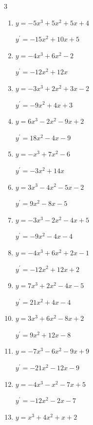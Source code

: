 \begin{multicols}{3}
\begin{enumerate}
        $\displaystyle y^{\prime}=27x^{2}+10x+9$

  \item $y=-5x^{3}+5x^{2}+5x+4$

        $\displaystyle y^{\prime}=-15x^{2}+10x+5$

  \item $y=-4x^{3}+6x^{2}-2$

        $\displaystyle y^{\prime}=-12x^{2}+12x$

  \item $y=-3x^{3}+2x^{2}+3x-2$

        $\displaystyle y^{\prime}=-9x^{2}+4x+3$

\columnbreak %

  \item $y=6x^{3}-2x^{2}-9x+2$

        $\displaystyle y^{\prime}=18x^{2}-4x-9$

  \item $y=-x^{3}+7x^{2}-6$

        $\displaystyle y^{\prime}=-3x^{2}+14x$

  \item $y=3x^{3}-4x^{2}-5x-2$

        $\displaystyle y^{\prime}=9x^{2}-8x-5$

  \item $y=-3x^{3}-2x^{2}-4x+5$

        $\displaystyle y^{\prime}=-9x^{2}-4x-4$

  \item $y=-4x^{3}+6x^{2}+2x-1$

        $\displaystyle y^{\prime}=-12x^{2}+12x+2$

  \item $y=7x^{3}+2x^{2}-4x-5$

        $\displaystyle y^{\prime}=21x^{2}+4x-4$

  \item $y=3x^{3}+6x^{2}-8x+2$

        $\displaystyle y^{\prime}=9x^{2}+12x-8$

  \item $y=-7x^{3}-6x^{2}-9x+9$

        $\displaystyle y^{\prime}=-21x^{2}-12x-9$

  \item $y=-4x^{3}-x^{2}-7x+5$

        $\displaystyle y^{\prime}=-12x^{2}-2x-7$

  \item $y=x^{3}+4x^{2}+x+2$


\end{enumerate}
\end{multicols}
